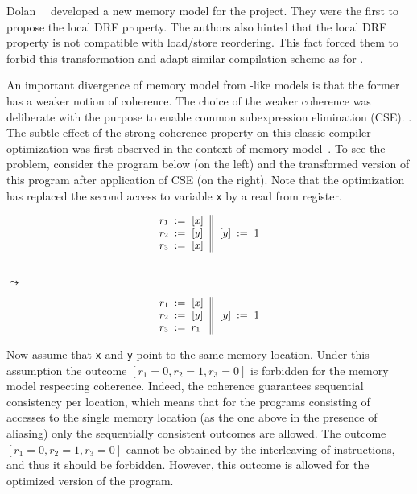 Dolan~\etal~\cite{Dolan-al:PLDI18} developed a new 
memory model for the \MOCaml project. 
They were the first to propose the local DRF property. 
The authors also hinted that the local DRF property 
is not compatible with load/store reordering.
This fact forced them to forbid this transformation
and adapt similar compilation scheme as for \RCMM. 

An important divergence of \OCaml memory model 
from \CMM-like models is that the former 
has a weaker notion of coherence.
The choice of the weaker coherence was deliberate 
with the purpose to enable common subexpression elimination (CSE).
.
The subtle effect of the strong coherence property 
on this classic compiler optimization was first 
observed in the context of \Java 
memory model~\cite{Pugh:JAVA99}.
To see the problem, consider the program below
(on the left) and the transformed version 
of this program after application of CSE (on the right).
Note that the optimization has replaced 
the second access to variable \texttt{x}
by a read from register. 

\begin{minipage}{0.45\linewidth}
\begin{equation*}
\small
\inarrII{
  \readInst{}{r_1}{x}      \\
  \readInst{}{r_2}{y}      \\
  \readInst{}{r_3}{x}      \\
}{
  \writeInst{}{y}{1}       \\
}
\label{ex:coh-rr}
\end{equation*}
\end{minipage}\hfill%
\begin{minipage}{0.05\linewidth}
\Large~\\ $\leadsto$
\end{minipage}\hfill%
\begin{minipage}{0.45\linewidth}
\begin{equation*}
\small
\inarrII{
  \readInst{}{r_1}{x}      \\
  \readInst{}{r_2}{y}      \\
  \assignInst{r_3}{r_1}    \\
}{
  \writeInst{}{y}{1}       \\
}
\label{ex:coh-rr}
\end{equation*}
\end{minipage}

Now assume that \texttt{x} and \texttt{y} point to the same memory location.
Under this assumption the outcome $[r_1=0, r_2=1, r_3=0]$
is forbidden for the memory model respecting coherence.
Indeed, the coherence guarantees sequential consistency per location, 
which means that for the programs consisting of accesses 
to the single memory location 
(as the one above in the presence of aliasing) 
only the sequentially consistent outcomes are allowed.
The outcome $[r_1=0, r_2=1, r_3=0]$ cannot be obtained 
by the interleaving of instructions, and thus 
it should be forbidden.  
However, this outcome is allowed for 
the optimized version of the program. 

